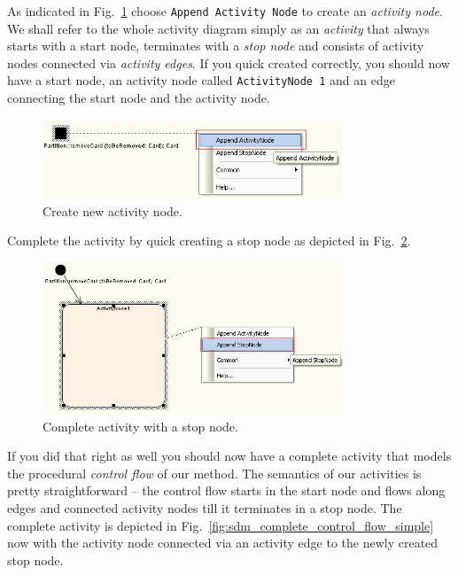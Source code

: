 As indicated in Fig.~\ref{fig:sdm_new_activity_node}
choose \texttt{Append Activity Node} to create an \emph{activity node}.  We
shall refer to the whole activity diagram simply as an \emph{activity} that
always starts with a start node, terminates with a \emph{stop node} and consists
of activity nodes connected via \emph{activity edges}.  If you quick created
correctly, you should now have a start node, an activity node called
\texttt{ActivityNode 1} and an edge connecting the start node and the activity
node.

\begin{figure}[htp]
\begin{center}
  \includegraphics[width=0.8\textwidth]{pics/sdmBilder/removeCard/sdm04RAW}
  \caption{Create new activity node.}  
  \label{fig:sdm_new_activity_node}
\end{center}
\end{figure}

Complete the activity by quick creating a stop node as depicted in
Fig.~\ref{fig:sdm_stop_node}.

\begin{figure}[htp]
\begin{center}
  \includegraphics[width=0.8\textwidth]{pics/sdmBilder/removeCard/sdm05RAW}
  \caption{Complete activity with a stop node.}  
  \label{fig:sdm_stop_node}
\end{center}
\end{figure}

If you did that right as well you should now have a complete activity that
models the procedural \emph{control flow} of our method.  The semantics of our
activities is pretty straightforward -- the control flow starts in the start
node and flows along edges and connected activity nodes till it terminates in a
stop node.  The complete activity is depicted in
Fig.~\ref{fig:sdm_complete_control_flow_simple} now with the activity node
connected via an activity edge to the newly created stop node.

